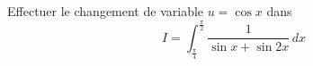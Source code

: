 Effectuer le changement de variable $u=\cos x$ dans
\begin{displaymath}
 I=\int_{\frac{\pi}{4}}^{\frac{\pi}{2}}\frac{1}{\sin x + \sin 2x}\,dx
\end{displaymath}
\bigskip \bigskip